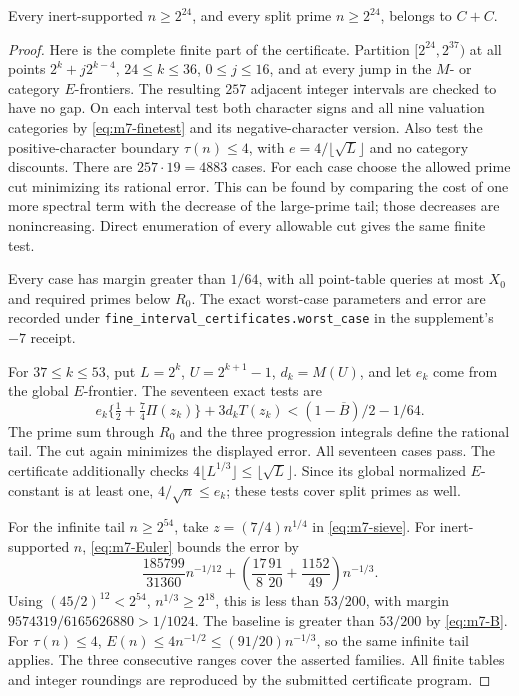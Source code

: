 \begin{lemma}\label{lem:m7-intervals}
Every inert-supported \(n\ge2^{24}\), and every split prime
\(n\ge2^{24}\), belongs to \(C+C\).
\end{lemma}

\begin{proof}
Here is the complete finite part of the certificate.
Partition \([2^{24},2^{37})\) at all points
\(2^k+j2^{k-4}\), \(24\le k\le36\), \(0\le j\le16\),
and at every jump in the \(M\)- or category \(E\)-frontiers.
The resulting \(257\) adjacent integer intervals are checked to
have no gap. On each interval test both character signs and
all nine valuation categories by \eqref{eq:m7-finetest} and its
negative-character version. Also test the positive-character
boundary \(\tau(n)\le4\), with \(e=4/\lfloor\sqrt L\rfloor\)
and no category discounts. There are \(257\cdot19=4883\) cases.
For each case choose the allowed prime cut minimizing its rational
error. This can be found by comparing the cost of one more
spectral term with the decrease of the large-prime tail; those
decreases are nonincreasing. Direct enumeration of every allowable
cut gives the same finite test.

Every case has margin greater than \(1/64\), with all point-table
queries at most \(X_0\) and required primes below \(R_0\).
The exact worst-case parameters and error are recorded under
\texttt{fine\_interval\_certificates.worst\_case} in the supplement's
\(-7\) receipt.

For \(37\le k\le53\), put \(L=2^k\), \(U=2^{k+1}-1\),
\(d_k=M(U)\), and let \(e_k\) come from the global \(E\)-frontier.
The seventeen exact tests are
\begin{equation}
 e_k\{\tfrac12+\tfrac74\Pi(z_k)\}+3d_kT(z_k)
                      <(1-\overline B)/2-1/64.                \label{eq:m7-highbins}
\end{equation}
The prime sum through \(R_0\) and the three progression integrals
define the rational tail. The cut again minimizes the displayed
error. All seventeen cases pass. The certificate additionally
checks \(4\lfloor L^{1/3}\rfloor\le\lfloor\sqrt L\rfloor\).
Since its global normalized \(E\)-constant is at least one,
\(4/\sqrt n\le e_k\); these tests cover split primes as well.

For the infinite tail \(n\ge2^{54}\), take
\(z=(7/4)n^{1/4}\) in \eqref{eq:m7-sieve}.
For inert-supported \(n\), \eqref{eq:m7-Euler} bounds the error by
\[
 \frac{185799}{31360}n^{-1/12}
      +\left(\frac{17}{8}\frac{91}{20}+\frac{1152}{49}\right)n^{-1/3}.
\]
Using \((45/2)^{12}<2^{54}\), \(n^{1/3}\ge2^{18}\), this is
less than \(53/200\), with margin
\(9574319/6165626880>1/1024\).
The baseline is greater than \(53/200\) by \eqref{eq:m7-B}.
For \(\tau(n)\le4\), \(E(n)\le4n^{-1/2}\le(91/20)n^{-1/3}\),
so the same infinite tail applies. The three consecutive ranges
cover the asserted families. All finite tables and integer
roundings are reproduced by the submitted certificate program.
\end{proof}

